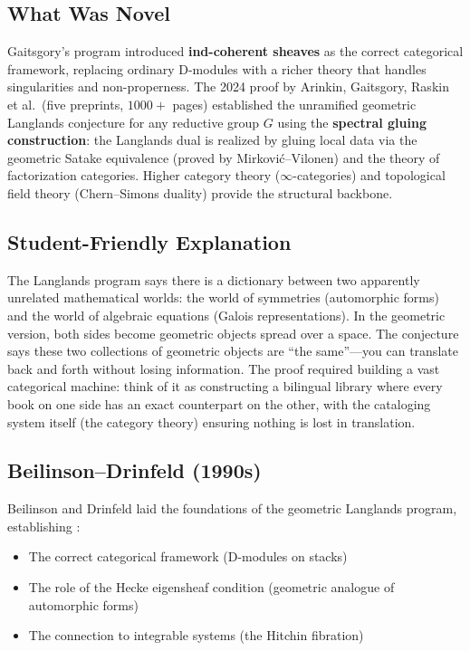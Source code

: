 \subsection{What Was Novel}
Gaitsgory's program introduced \textbf{ind-coherent sheaves} as the correct categorical framework, replacing ordinary D-modules with a richer theory that handles singularities and non-properness. The 2024 proof by Arinkin, Gaitsgory, Raskin et al.\ (five preprints, $1000+$ pages) established the unramified geometric Langlands conjecture for any reductive group $G$ using the \textbf{spectral gluing construction}: the Langlands dual is realized by gluing local data via the geometric Satake equivalence (proved by Mirkovi\'c--Vilonen) and the theory of factorization categories. Higher category theory ($\infty$-categories) and topological field theory (Chern--Simons duality) provide the structural backbone.

\subsection{Student-Friendly Explanation}
The Langlands program says there is a dictionary between two apparently unrelated mathematical worlds: the world of symmetries (automorphic forms) and the world of algebraic equations (Galois representations). In the geometric version, both sides become geometric objects spread over a space. The conjecture says these two collections of geometric objects are ``the same''---you can translate back and forth without losing information. The proof required building a vast categorical machine: think of it as constructing a bilingual library where every book on one side has an exact counterpart on the other, with the cataloging system itself (the category theory) ensuring nothing is lost in translation.

\subsection{Beilinson--Drinfeld (1990s)}

Beilinson and Drinfeld laid the foundations of the geometric Langlands program, establishing \cite{beilinson2004}:

\begin{itemize}
\item The correct categorical framework (D-modules on stacks)
\item The role of the Hecke eigensheaf condition (geometric analogue of automorphic forms)
\item The connection to integrable systems (the Hitchin fibration)
\end{itemize}

